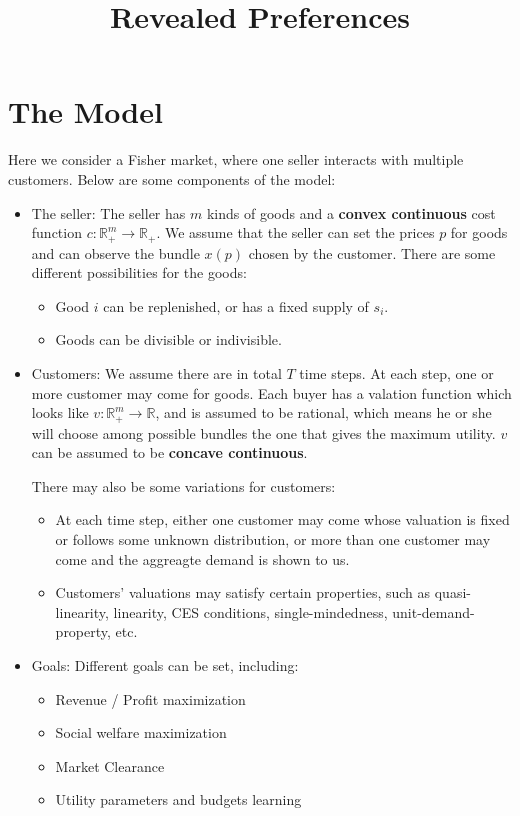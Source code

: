 \documentclass{article}
\author{}
\title{Revealed Preferences}
\begin{document}
\newcommand{\tbf}[1]{\textbf{#1}}
\newcommand{\bs}[1]{\boldsymbol{#1}}
\newcommand{\mr}[1]{\mathrm{#1}}
\newcommand{\mc}[1]{\mathcal{#1}}
\newcommand{\mbb}[1]{\mathbb{#1}}
\newcommand{\mbf}[1]{\mathbf{#1}}
\let\onlyif\Longleftarrow

\maketitle

\section*{The Model}
Here we consider a Fisher market, where one seller interacts with multiple customers. Below are some components of the model:
\begin{itemize}
\item The seller: The seller has $m$ kinds of goods and a \textbf{convex continuous} cost function $c:\mbb{R}_+^m\rightarrow\mbb{R}_+$. We assume that the seller can set the prices $p$ for goods and can observe the bundle $x(p)$ chosen by the customer. There are some different possibilities for the goods:
\begin{itemize}
\item Good $i$  can be replenished, or has a fixed supply of $s_i$.
\item Goods can be divisible or indivisible.
\end{itemize}

\item Customers: We assume there are in total $T$ time steps. At each step, one or more customer may come for goods. Each buyer has a valation function which looks like $v:\mbb{R}_+^m\rightarrow\mbb{R}$, and is assumed to be rational, which means he or she will choose among possible bundles the one that gives the maximum utility. $v$ can be assumed to be \textbf{concave continuous}.

There may also be some variations for customers:
\begin{itemize}
\item At each time step, either one customer may come whose valuation is fixed or follows some unknown distribution, or more than one customer may come and the aggreagte demand is shown to us.
\item Customers' valuations may satisfy certain properties, such as quasi-linearity, linearity, CES conditions, single-mindedness, unit-demand-property, etc.
\end{itemize}

\item Goals: Different goals can be set, including:
\begin{itemize}
\item Revenue / Profit maximization
\item Social welfare maximization
\item Market Clearance
\item Utility parameters and budgets learning
\end{itemize}
\end{itemize}
\end{document}
